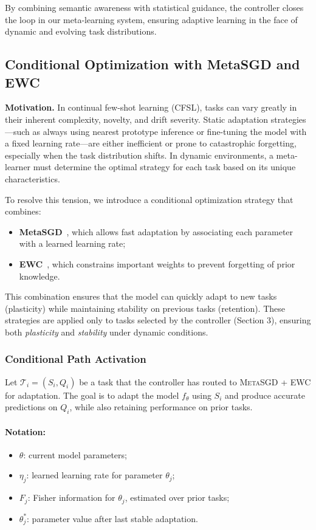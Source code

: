 \documentclass[conference]{IEEEtran}
\begin{document}
By combining semantic awareness with statistical guidance, the controller closes the loop in our meta-learning system, ensuring adaptive learning in the face of dynamic and evolving task distributions.


\subsection{Conditional Optimization with MetaSGD and EWC}

\textbf{Motivation.}  
In continual few-shot learning (CFSL), tasks can vary greatly in their inherent complexity, novelty, and drift severity. Static adaptation strategies—such as always using nearest prototype inference or fine-tuning the model with a fixed learning rate—are either inefficient or prone to catastrophic forgetting, especially when the task distribution shifts. In dynamic environments, a meta-learner must determine the optimal strategy for each task based on its unique characteristics. 

To resolve this tension, we introduce a conditional optimization strategy that combines:
\begin{itemize}
    \item \textbf{MetaSGD}~\cite{li2017metasgd}, which allows fast adaptation by associating each parameter with a learned learning rate;
    \item \textbf{EWC}~\cite{kirkpatrick2017ewc}, which constrains important weights to prevent forgetting of prior knowledge.
\end{itemize}

This combination ensures that the model can quickly adapt to new tasks (plasticity) while maintaining stability on previous tasks (retention). These strategies are applied only to tasks selected by the controller (Section 3), ensuring both \textit{plasticity} and \textit{stability} under dynamic conditions.

\subsubsection*{Conditional Path Activation}

Let $\mathcal{T}_i = (S_i, Q_i)$ be a task that the controller has routed to \textsc{MetaSGD + EWC} for adaptation. The goal is to adapt the model $f_\theta$ using $S_i$ and produce accurate predictions on $Q_i$, while also retaining performance on prior tasks.

\paragraph{Notation:}
\begin{itemize}
    \item $\theta$: current model parameters;
    \item $\eta_j$: learned learning rate for parameter $\theta_j$;
    \item $F_j$: Fisher information for $\theta_j$, estimated over prior tasks;
    \item $\theta_j^*$: parameter value after last stable adaptation.
\end{itemize}
\end{document}
